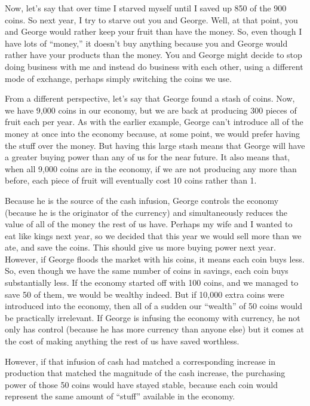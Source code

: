 Now, let’s say that over time I starved myself until I saved up 850 of
the 900 coins. So next year, I try to starve out you and George. Well,
at that point, you and George would rather keep your fruit than have
the money. So, even though I have lots of “money,” it doesn’t buy
anything because you and George would rather have your products than
the money. You and George might decide to stop doing business with me
and instead do business with each other, using a different mode of
exchange, perhaps simply switching the coins we use.

From a different perspective, let’s say that George found a stash of
coins. Now, we have 9,000 coins in our economy, but we are back at
producing 300 pieces of fruit each per year. As with the earlier
example, George can’t introduce all of the money at once into the
economy because, at some point, we would prefer having the stuff over
the money. But having this large stash means that George will have a
greater buying power than any of us for the near future. It also means
that, when all 9,000 coins are in the economy, if we are not producing
any more than before, each piece of fruit will eventually cost 10 coins
rather than 1. 

Because he is the source of the cash infusion, George controls the
economy (because he is the originator of the currency) and
simultaneously reduces the value of all of the money the rest of us
have. Perhaps my wife and I wanted to eat like kings next year, so we
decided that this year we would sell more than we ate, and save the
coins. This should give us more buying power next year. However, if
George floods the market with his coins, it means each coin buys less.
So, even though we have the same number of coins in savings, each coin
buys substantially less. If the economy started off with 100 coins, and
we managed to save 50 of them, we would be wealthy indeed. But if
10,000 extra coins were introduced into the economy, then all of a
sudden our “wealth” of 50 coins would be practically irrelevant. If
George is infusing the economy with currency, he not only has control
(because he has more currency than anyone else) but it comes at the
cost of making anything the rest of us have saved worthless. 

However, if that infusion of cash had matched a corresponding increase
in production that matched the magnitude of the cash increase, the
purchasing power of those 50 coins would have stayed stable, because
each coin would represent the same amount of “stuff” available in the
economy.

